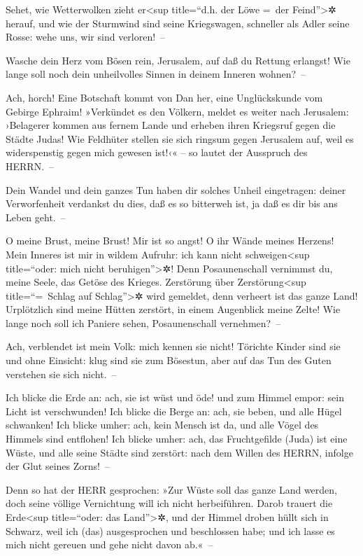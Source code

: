 Sehet, wie Wetterwolken zieht er\textless sup
title=``d.h. der Löwe =~der Feind''\textgreater✲ herauf, und wie der
Sturmwind sind seine Kriegswagen, schneller als Adler seine Rosse: wehe
uns, wir sind verloren!~--

Wasche dein Herz vom Bösen rein, Jerusalem, auf daß du
Rettung erlangst! Wie lange soll noch dein unheilvolles Sinnen in deinem
Inneren wohnen?~--

Ach, horch! Eine Botschaft kommt von Dan her, eine
Unglückskunde vom Gebirge Ephraim! »Verkündet es den
Völkern, meldet es weiter nach Jerusalem: ›Belagerer kommen aus fernem
Lande und erheben ihren Kriegsruf gegen die Städte Judas!
Wie Feldhüter stellen sie sich ringsum gegen Jerusalem
auf, weil es widerspenstig gegen mich gewesen ist!‹« -- so lautet der
Ausspruch des HERRN.~--

Dein Wandel und dein ganzes Tun haben dir solches Unheil
eingetragen: deiner Verworfenheit verdankst du dies, daß es so bitterweh
ist, ja daß es dir bis ans Leben geht.~--

O meine Brust, meine Brust! Mir ist so angst! O ihr Wände
meines Herzens! Mein Inneres ist mir in wildem Aufruhr: ich kann nicht
schweigen\textless sup title=``oder: mich nicht
beruhigen''\textgreater✲! Denn Posaunenschall vernimmst du, meine Seele,
das Getöse des Krieges. Zerstörung über
Zerstörung\textless sup title=``=~Schlag auf Schlag''\textgreater✲ wird
gemeldet, denn verheert ist das ganze Land! Urplötzlich sind meine
Hütten zerstört, in einem Augenblick meine Zelte! Wie
lange noch soll ich Paniere sehen, Posaunenschall vernehmen?~--

Ach, verblendet ist mein Volk: mich kennen sie nicht!
Törichte Kinder sind sie und ohne Einsicht: klug sind sie zum Bösestun,
aber auf das Tun des Guten verstehen sie sich nicht.~--

Ich blicke die Erde an: ach, sie ist wüst und öde! und
zum Himmel empor: sein Licht ist verschwunden! Ich blicke
die Berge an: ach, sie beben, und alle Hügel schwanken!
Ich blicke umher: ach, kein Mensch ist da, und alle Vögel
des Himmels sind entflohen! Ich blicke umher: ach, das
Fruchtgefilde (Juda) ist eine Wüste, und alle seine Städte sind
zerstört: nach dem Willen des HERRN, infolge der Glut seines Zorns!~--

Denn so hat der HERR gesprochen: »Zur Wüste soll das
ganze Land werden, doch seine völlige Vernichtung will ich nicht
herbeiführen. Darob trauert die Erde\textless sup
title=``oder: das Land''\textgreater✲, und der Himmel droben hüllt sich
in Schwarz, weil ich (das) ausgesprochen und beschlossen habe; und ich
lasse es mich nicht gereuen und gehe nicht davon ab.«~--


